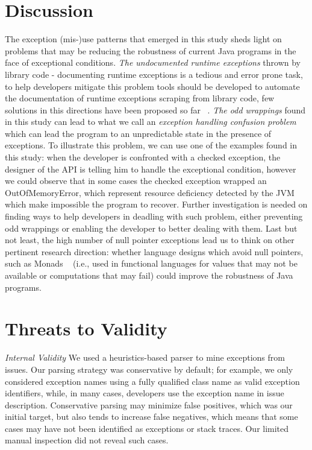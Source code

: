 \documentclass[conference]{IEEEtran}
\begin{document}
\section{Discussion}

The exception (mis-)use patterns that emerged  in this study sheds light on 
problems that may be reducing the robustness of current Java programs in the face of
exceptional conditions. \noindent\emph{The undocumented runtime exceptions} thrown by library code -
documenting runtime exceptions is a tedious and error prone task, to help developers
mitigate this problem tools should be developed to automate the documentation of runtime exceptions
scraping from library code, few solutions in this directions have been proposed so far ~\cite{van2005combining}. 
 \noindent\emph{The odd wrappings}  found in this study can lead to what we call
an \emph{exception handling confusion problem} which can lead the program to
an unpredictable state in the presence of exceptions. To illustrate this problem, we can use
 one of the examples found in this study: when the developer is 
confronted with a checked exception, the designer of the API is telling him 
to handle the exceptional condition, however we could observe that in some cases the 
checked exception wrapped an OutOfMemoryError, which represent resource deficiency detected 
by the JVM which make impossible the program to recover. Further investigation is needed on finding 
ways to help developers in deadling with such problem, either preventing odd wrappings or enabling 
the developer to better dealing with them. Last but not least, the high number of null pointer exceptions 
lead us to think on other pertinent research direction: whether language designs which avoid null pointers, 
such as Monads ~\cite{Walde95} (i.e., used in functional languages for values that may not be available 
or computations that may fail) could improve the robustness of Java programs. 

\section{Threats to Validity}

\noindent\emph{Internal Validity} We used a heuristics-based parser to mine
exceptions from issues.  Our parsing strategy was conservative by default; for
example, we only considered exception names using a fully qualified class name
as valid exception identifiers, while, in many cases, developers use the
exception name in issue description. Conservative parsing may minimize false
positives, which was our initial target, but also tends to increase false
negatives, which means that some cases may have not been identified as
exceptions or stack traces. Our limited manual inspection did not reveal such
cases.
\end{document}
